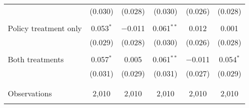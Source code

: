 \begin{tabular}{@{\extracolsep{5pt}}lccccc}
  & (0.030) & (0.028) & (0.030) & (0.026) & (0.028) \\ 
  & & & & & \\ 
 Policy treatment only & 0.053$^{*}$ & $-$0.011 & 0.061$^{**}$ & 0.012 & 0.001 \\ 
  & (0.029) & (0.028) & (0.030) & (0.026) & (0.028) \\ 
  & & & & & \\ 
 Both treatments & 0.057$^{*}$ & 0.005 & 0.061$^{**}$ & $-$0.011 & 0.054$^{*}$ \\ 
  & (0.031) & (0.029) & (0.031) & (0.027) & (0.029) \\ 
  & & & & & \\ 
\hline \\[-1.8ex] 

Observations & 2,010 & 2,010 & 2,010 & 2,010 & 2,010 \\ 
\hline 
\hline \\[-1.8ex] 
\end{tabular} 